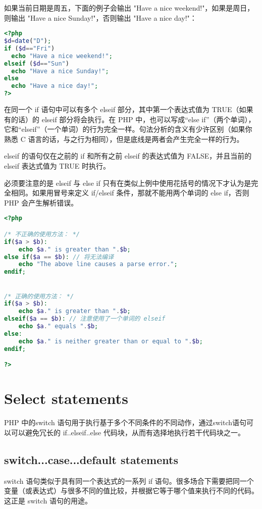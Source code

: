 如果当前日期是周五，下面的例子会输出 "Have a nice weekend!"，如果是周日，则输出 "Have a nice Sunday!"，否则输出 "Have a nice day!"：

\begin{lstlisting}[language=PHP]
<?php
$d=date("D");
if ($d=="Fri")
  echo "Have a nice weekend!"; 
elseif ($d=="Sun")
  echo "Have a nice Sunday!"; 
else
  echo "Have a nice day!"; 
?>
\end{lstlisting}

在同一个 if 语句中可以有多个 elseif 部分，其中第一个表达式值为 TRUE（如果有的话）的 elseif 部分将会执行。在 PHP 中，也可以写成“else if”（两个单词），它和“elseif”（一个单词）的行为完全一样。句法分析的含义有少许区别（如果你熟悉 C 语言的话，与之行为相同），但是底线是两者会产生完全一样的行为。

elseif 的语句仅在之前的 if 和所有之前 elseif 的表达式值为 FALSE，并且当前的 elseif 表达式值为 TRUE 时执行。

必须要注意的是 elseif 与 else if 只有在类似上例中使用花括号的情况下才认为是完全相同。如果用冒号来定义 if/elseif 条件，那就不能用两个单词的 else if，否则 PHP 会产生解析错误。

\begin{lstlisting}[language=PHP]
<?php

/* 不正确的使用方法： */
if($a > $b):
    echo $a." is greater than ".$b;
else if($a == $b): // 将无法编译
    echo "The above line causes a parse error.";
endif;


/* 正确的使用方法： */
if($a > $b):
    echo $a." is greater than ".$b;
elseif($a == $b): // 注意使用了一个单词的 elseif
    echo $a." equals ".$b;
else:
    echo $a." is neither greater than or equal to ".$b;
endif;

?>
\end{lstlisting}


\section{Select statements}

PHP 中的switch 语句用于执行基于多个不同条件的不同动作，通过switch语句可以可以避免冗长的 if..elseif..else 代码块，从而有选择地执行若干代码块之一。


\subsection{switch...case...default statements}

switch 语句类似于具有同一个表达式的一系列 if 语句。很多场合下需要把同一个变量（或表达式）与很多不同的值比较，并根据它等于哪个值来执行不同的代码。这正是 switch 语句的用途。

